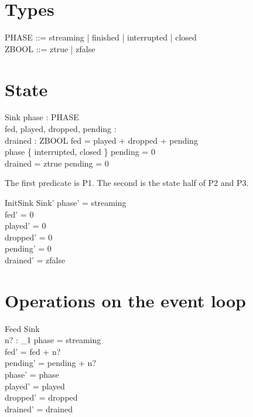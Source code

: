 \documentclass[a4paper,10pt,fleqn]{article}
\begin{document}
\section{Types}

\begin{zed}
  PHASE ::= streaming | finished | interrupted | closed \\
  ZBOOL ::= ztrue | zfalse
\end{zed}

\section{State}

\begin{schema}{Sink}
  phase : PHASE \\
  fed, played, dropped, pending : \nat \\
  drained : ZBOOL
\where
  fed = played + dropped + pending \\
  phase \in \{ interrupted, closed \} \implies pending = 0 \\
  drained = ztrue \implies pending = 0
\end{schema}

The first predicate is P1. The second is the state half of P2 and P3.

\begin{schema}{InitSink}
  Sink'
\where
  phase' = streaming \\
  fed' = 0 \\
  played' = 0 \\
  dropped' = 0 \\
  pending' = 0 \\
  drained' = zfalse
\end{schema}

\section{Operations on the event loop}

\begin{schema}{Feed}
  \Delta Sink \\
  n? : \nat_1
\where
  phase = streaming \\
  fed' = fed + n? \\
  pending' = pending + n? \\
  phase' = phase \\
  played' = played \\
  dropped' = dropped \\
  drained' = drained
\end{schema}
\end{document}
